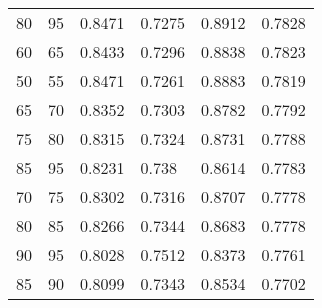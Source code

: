 \begin{center}
\begin{longtable}{|l|l|l|l|l|l|}
80 & 95 & 0.8471 & 0.7275 & 0.8912 & 0.7828 \\
60 & 65 & 0.8433 & 0.7296 & 0.8838 & 0.7823 \\
50 & 55 & 0.8471 & 0.7261 & 0.8883 & 0.7819 \\
65 & 70 & 0.8352 & 0.7303 & 0.8782 & 0.7792 \\
75 & 80 & 0.8315 & 0.7324 & 0.8731 & 0.7788 \\
85 & 95 & 0.8231 & 0.738  & 0.8614 & 0.7783 \\
70 & 75 & 0.8302 & 0.7316 & 0.8707 & 0.7778 \\
80 & 85 & 0.8266 & 0.7344 & 0.8683 & 0.7778 \\
90 & 95 & 0.8028 & 0.7512 & 0.8373 & 0.7761 \\
85 & 90 & 0.8099 & 0.7343 & 0.8534 & 0.7702
\end{longtable}

\end{center}


